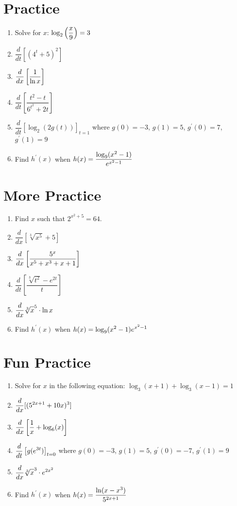 \documentclass[10pt]{article}
\begin{document}



\section{Practice }
    \begin{enumerate}
    \item Solve for $x$: $\displaystyle \log_2\left(\frac{x}{9}\right)=3$
    \item $\dfrac{d}{dt}[ (4^t + 5)^2]$
    \item $\displaystyle \dfrac{d}{dx}\left[\frac{1}{\ln x}\right]$
    \item $\dfrac{d}{dt}\left[\dfrac{t^2-t}{6^{t^2}+2t}\right]$
    \item $\dfrac{d}{dt}\left[\log_2(2g(t))\right]_{t=1}$ where $g(0)=-3$, $g(1)=5$, $g^{\prime}(0)= 7$, $g^{\prime}(1)= 9$ 
     \item Find $h^{\prime}(x)$ when $\displaystyle h(x)=\frac{\log_9(x^2-1)}{e^{x^2-1}}$
    \end{enumerate}
\newpage%


\section{ More Practice}
    \begin{enumerate}
    \item Find $x$ such that $2^{x^2+5}=64$.
    \item $\dfrac{d}{dx} \left[ \sqrt[3]{x^5} + 5\right]$
    \item $\displaystyle \dfrac{d}{dx}\left[ \frac{5^x}{x^5 + x^3 + x + 1}\right]$
    \item $\dfrac{d}{dt}\left[\dfrac{\sqrt[3]{t^2}- e^{2t}}{t}\right]$
    \item $\displaystyle \frac{d}{dx} \sqrt[3] x^5 \cdot \ln x$
     \item Find $h^{\prime}(x)$ when $\displaystyle h(x)=\log_9(x^2-1)e^{x^2-1}$
    \end{enumerate}
\newpage%

\section{Fun Practice}
    \begin{enumerate}
    \item Solve for $x$ in the following equation: $\log_3(x+1)+\log_3(x-1)=1$
    \item $\displaystyle \dfrac{d}{dx}[(5^{2x+1} + 10x)^3]$
    \item $\displaystyle \dfrac{d}{dx}\left[\frac{1}{x} + \log_6( x)\right]$
    \item $\displaystyle \dfrac{d}{dt}\left[ g(e^{3t})\right]_{t=0}$  where $g(0)=-3$, $g(1)=5$, $g^{\prime}(0)= -7$, $g^{\prime}(1)= 9$ 
    \item $\displaystyle \frac{d}{dx} \sqrt[3]x^3 \cdot e^{2x^2}$
      \item Find $h^{\prime}(x)$ when $\displaystyle h(x)=\frac{\ln(x-x^3)}{5^{2x+1}}$
    \end{enumerate}
    \newpage%
\end{document}
